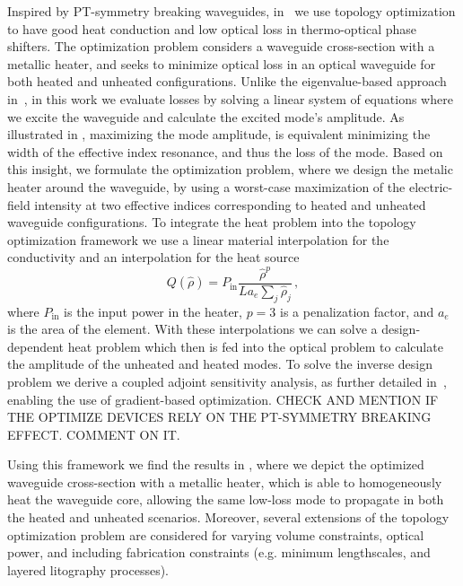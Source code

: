 Inspired by PT-symmetry breaking waveguides, in~\cite{ownpub0} we use topology optimization to have good heat conduction and low optical loss in thermo-optical phase shifters.
The optimization problem considers a waveguide cross-section with a metallic heater, and seeks to minimize optical loss in an optical waveguide for both heated and 
unheated configurations. Unlike the eigenvalue-based approach in~\cite{lipson}, in this work we evaluate losses by solving a linear system of equations where we excite the waveguide 
and calculate the excited mode's 
amplitude. As illustrated in , maximizing the mode amplitude, is equivalent minimizing the width of the effective 
index resonance, and thus the loss of the mode. Based on this insight, we formulate the optimization problem, where we design the metalic heater around the waveguide, by using a worst-case maximization 
of the electric-field intensity at two effective indices corresponding to heated and unheated 
waveguide configurations. To integrate the heat problem into the topology optimization framework we use a linear material interpolation 
for the conductivity and an interpolation for the heat source
\begin{equation}
    Q(\hat{\rho})=P_{\text{in}} \frac{\hat{\rho}^p}{L a_e \sum_j \hat{\rho}_j}\,,
\end{equation}
where $P_\text{in}$ is the input power in the heater, $p=3$ is a penalization factor, and $a_e$ is the area of the element. With these interpolations we can solve a design-dependent
heat problem which then is fed into the optical problem to calculate the amplitude of the unheated and heated modes. To solve the inverse design
problem we derive a coupled adjoint sensitivity analysis, as further detailed in~\cite{ownpub0}, enabling the use of gradient-based optimization. CHECK AND
MENTION IF THE OPTIMIZE DEVICES RELY ON THE PT-SYMMETRY BREAKING EFFECT. COMMENT ON IT.

Using this framework we find the results in , where we depict the optimized waveguide cross-section with a metallic heater, which is able to homogeneously heat the waveguide core,
allowing the same low-loss mode to propagate in both the heated and unheated scenarios. Moreover, several extensions of the topology optimization problem are considered for varying volume constraints, optical power, and including fabrication constraints (e.g. minimum lengthscales, and layered 
litography processes).

